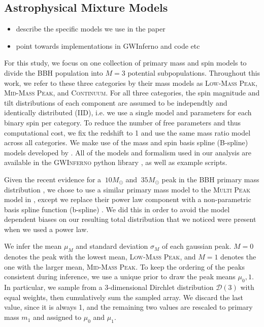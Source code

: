 \subsection{Astrophysical Mixture Models} \label{sec:astromodels}

\begin{itemize}
    \item describe the specific models we use in the paper
    \item point towards implementations in GWInferno and code etc
\end{itemize}

For this study, we focus on one collection of primary mass and spin models to divide the BBH population into $M=3$ potential subpopulations. Throughout this work, we refer to these three categories by their mass models as \textsc{Low-Mass Peak}, \textsc{Mid-Mass Peak}, and \textsc{Continuum}. For all three categories, the spin magnitude and tilt distributions of each component are assumed to be independtly and identically distributed (IID), i.e. we use a single model and parameters for each binary spin per category. To reduce the number of free parameters and thus computational cost, we fix the redshift to 1 and use the same mass ratio model across all categories. We make use of the mass and spin basis spline (B-spline) models developed by \cite{2022arXiv221012834E}. All of the models and formalism used in our analysis are available in the \textsc{GWInferno} python library , as well as example scripts. 

Given the recent evidence for a $~10 M_{\odot}$ and $~35 M_{\odot}$ peak in the BBH primary mass distribution \citep{2111.03634, 2022ApJ...928..155T, 10.3847/2041-8213/aa9bf6, 10.3847/1538-4357/aab34c, 10.3847/2041-8213/ab3800, 2021ApJ...913L...7A}, we chose to use a similar primary mass model to the \textsc{Multi Peak} model in \cite{2021ApJ...913L...7A}, except we replace their power law component with a non-parametric basis spline function (b-spline) . We did this in order to avoid the model dependent biases on our resulting total distribution that we noticed were present when we used a power law.

We infer the mean $\mu_M$ and standard deviation $\sigma_M$ of each gaussian peak. $M=0$ denotes the peak with the lowest mean, \textsc{Low-Mass Peak}, and $M=1$ denotes the one with the larger mean, \textsc{Mid-Mass Peak}. To keep the ordering of the peaks consistent during inference, we use a unique prior to draw the peak means $\mu_0,1$. In particular, we sample from a 3-dimensional Dirchlet distribution $\mathcal{D}(3)$ with equal weights, then cumulatively sum the sampled array. We discard the last value, since it is always 1, and the remaining two values are rescaled to primary mass $m_1$ and assigned to $\mu_0$ and $\mu_1$. 

